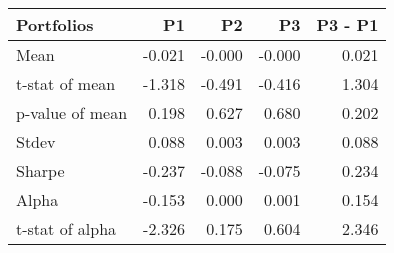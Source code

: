 \begin{tabular}{lrrrr}
\toprule
Portfolios & P1 & P2 & P3 & P3 - P1 \\
\midrule
Mean & -0.021 & -0.000 & -0.000 & 0.021 \\
t-stat of mean & -1.318 & -0.491 & -0.416 & 1.304 \\
p-value of mean & 0.198 & 0.627 & 0.680 & 0.202 \\
Stdev & 0.088 & 0.003 & 0.003 & 0.088 \\
Sharpe & -0.237 & -0.088 & -0.075 & 0.234 \\
Alpha & -0.153 & 0.000 & 0.001 & 0.154 \\
t-stat of alpha & -2.326 & 0.175 & 0.604 & 2.346 \\
\bottomrule
\end{tabular}
